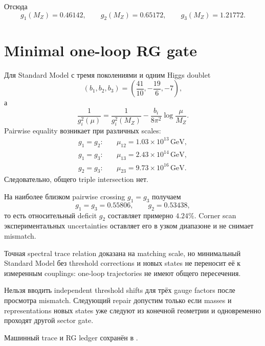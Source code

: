 Отсюда
\begin{equation}
g_1(M_Z)=0.46142,
\qquad
g_2(M_Z)=0.65172,
\qquad
g_3(M_Z)=1.21772.
\end{equation}

\section{Minimal one-loop RG gate}

Для Standard Model с тремя поколениями и одним Higgs doublet
\begin{equation}
(b_1,b_2,b_3)=\left(\frac{41}{10},-\frac{19}{6},-7\right),
\end{equation}
а
\begin{equation}
\frac1{g_i^2(\mu)}=
\frac1{g_i^2(M_Z)}-\frac{b_i}{8\pi^2}\log\frac{\mu}{M_Z}.
\end{equation}
Pairwise equality возникает при различных scales:
\begin{align}
g_1=g_2:&\quad \mu_{12}=1.03\times10^{13}\,\mathrm{GeV},\\
g_1=g_3:&\quad \mu_{13}=2.43\times10^{14}\,\mathrm{GeV},\\
g_2=g_3:&\quad \mu_{23}=9.73\times10^{16}\,\mathrm{GeV}.
\end{align}
Следовательно, общего triple intersection нет.

На наиболее близком pairwise crossing \(g_1=g_3\) получаем
\begin{equation}
g_1=g_3=0.55806,
\qquad
g_2=0.53438,
\end{equation}
то есть относительный deficit \(g_2\) составляет примерно \(4.24\%\).
Corner scan экспериментальных uncertainties оставляет его в узком диапазоне
и не снимает mismatch.

\begin{theorem}
Точная spectral trace relation доказана на matching scale, но минимальный
Standard Model без threshold corrections и новых states не переносит её к
измеренным couplings: one-loop trajectories не имеют общего пересечения.
\end{theorem}

\begin{nogocriterion}
Нельзя вводить independent threshold shifts для трёх gauge factors после
просмотра mismatch. Следующий repair допустим только если masses и
representations новых states уже следуют из конечной геометрии и одновременно
проходят другой sector gate.
\end{nogocriterion}

Машинный trace и RG ledger сохранён в
.
